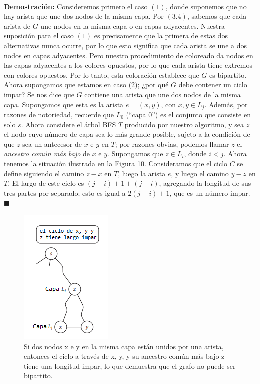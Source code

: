 \documentclass[a4paper, 12pt]{book}
\theoremstyle{dotless}
\begin{document}
\paragraph{}
\textbf{Demostración:} Consideremos primero el caso $(1)$, donde suponemos que no hay arista que une dos nodos de la misma capa. Por $(3.4)$, sabemos que cada arista de $G$ une nodos en la misma capa o en capas adyacentes. Nuestra suposición para el caso $(1)$ es precisamente que la primera de estas dos alternativas nunca ocurre, por lo que esto significa que cada arista se une a dos nodos en capas adyacentes. Pero nuestro procedimiento de coloreado da nodos en las capas adyacentes a los colores opuestos, por lo que cada arista tiene extremos con colores opuestos. Por lo tanto, esta coloración establece que $G$ es bipartito.
Ahora supongamos que estamos en caso (2); ¿por qué $G$ debe contener un ciclo impar? Se nos dice que $G$ contiene una arista que une dos nodos de la misma capa. Supongamos que esta es la arista \(e = (x, y)\), con \(x, y  \in  L_{j}\). Además, por razones de notoriedad, recuerde que \(L_{0}\) (``capa 0'') es el conjunto que consiste en solo $s$. Ahora considere el árbol BFS $T$ producido por nuestro algoritmo, y sea $z$ el nodo cuyo número de capa sea lo más grande posible, sujeto a la condición de que $z$ sea un antecesor de $x$ e $y$ en $T$; por razones obvias, podemos llamar $z$ el \textit{ancestro común más bajo} de $x$ e $y$. Supongamos que \(z  \in  L_{i}\), donde \(i <j\). Ahora tenemos la situación ilustrada en la Figura 10. Consideramos que el ciclo $C$ se define siguiendo el camino $z-x$ en $T$, luego la arista $e$, y luego el camino $y-z$ en $T$. El largo de este ciclo es \((j - i) + 1+ (j - i)\), agregando la longitud de sus tres partes por separado; esto es igual a \(2(j - i) + 1\), que es un número impar. $ \blacksquare $ 


\begin{figure}[h]
\centering
\includegraphics[scale=1]{Imagenes-Seccion3/3dot6.png}
\caption{Si dos nodos x e y en la misma capa están unidos por una arista, entonces el ciclo a través de x, y, y su ancestro común más bajo z tiene una longitud impar, lo que demuestra que el grafo no puede ser bipartito.}
\label{Fig36}
\end{figure}
\end{document}
